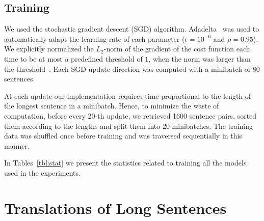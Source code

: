 \subsection{Training}

We used the stochastic gradient descent (SGD) algorithm.
Adadelta~\citep{Zeiler2012} was used to automatically adapt the learning rate of
each parameter ($\epsilon=10^{-6}$ and $\rho=0.95$). We explicitly normalized
the $L_2$-norm of the gradient of the cost function each time to be at most a
predefined threshold of $1$, when the norm was larger than the
threshold~\citep{Pascanu2013}.  Each SGD update direction was computed with a
minibatch of 80 sentences. 

At each update our implementation requires time proportional to the length of
the longest sentence in a minibatch. Hence, to minimize the waste of
computation, before every 20-th update, we retrieved 1600 sentence pairs, sorted them
according to the lengths and split them into 20 minibatches. The training data
was shuffled once before training and was traversed sequentially in this manner.

In Tables~\ref{tbl:stat} we present the statistics related to training all the
models used in the experiments.


\section{Translations of Long Sentences}
\label{sec:long_translation}

